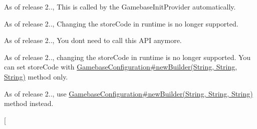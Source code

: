 
\begin{DoxyRefList}
\item[\label{deprecated__deprecated000001}%
\Hypertarget{deprecated__deprecated000001}%
Member \hyperlink{classcom_1_1toast_1_1android_1_1gamebase_1_1_gamebase_a07fe4c62c585e8af9f924935e813ff12}{Gamebase.active\+App} (final Context application\+Context)]As of release 2.., This is called by the Gamebase\+Init\+Provider automatically.  
\item[\label{deprecated__deprecated000002}%
\Hypertarget{deprecated__deprecated000002}%
Member \hyperlink{classcom_1_1toast_1_1android_1_1gamebase_1_1_gamebase_1_1_purchase_ae6a7d3ccf1e7de6fb479485cce1ddeea}{Gamebase.Purchase.get\+Store\+Code} ()]As of release 2.., Changing the store\+Code in runtime is no longer supported.  
\item[\label{deprecated__deprecated000004}%
\Hypertarget{deprecated__deprecated000004}%
Member \hyperlink{classcom_1_1toast_1_1android_1_1gamebase_1_1_gamebase_1_1_purchase_a041c6d7111a2815fe52823a2a56aaec5}{Gamebase.Purchase.request\+Retry\+Transaction} ( final Activity activity,  final Gamebase\+Data\+Callback$<$ Purchasable\+Retry\+Transaction\+Result $>$ callback)]As of release 2.., You don\textquotesingle{}t need to call this A\+PI anymore.  
\item[\label{deprecated__deprecated000003}%
\Hypertarget{deprecated__deprecated000003}%
Member \hyperlink{classcom_1_1toast_1_1android_1_1gamebase_1_1_gamebase_1_1_purchase_a8933fcc2fc156c87feee53efadfa4bb0}{Gamebase.Purchase.set\+Store\+Code} (final String store\+Code)]As of release 2.., changing the store\+Code in runtime is no longer supported. You can set store\+Code with \hyperlink{classcom_1_1toast_1_1android_1_1gamebase_1_1_gamebase_configuration_a7c28786c8e446dd54cb5f4d0797b6564}{Gamebase\+Configuration\#new\+Builder(\+String, String, String)} method only.  
\item[\label{deprecated__deprecated000010}%
\Hypertarget{deprecated__deprecated000010}%
Member \hyperlink{classcom_1_1toast_1_1android_1_1gamebase_1_1_gamebase_configuration_1_1_builder_afbe6729f6423577d9a06c1832315f37d}{Gamebase\+Configuration.Builder.Builder} (String app\+Id, String app\+Version)]As of release 2.., use \hyperlink{classcom_1_1toast_1_1android_1_1gamebase_1_1_gamebase_configuration_a7c28786c8e446dd54cb5f4d0797b6564}{Gamebase\+Configuration\#new\+Builder(\+String, String, String)} method instead.  
\item[\label{deprecated__deprecated000013}%
%

\end{DoxyRefList}
